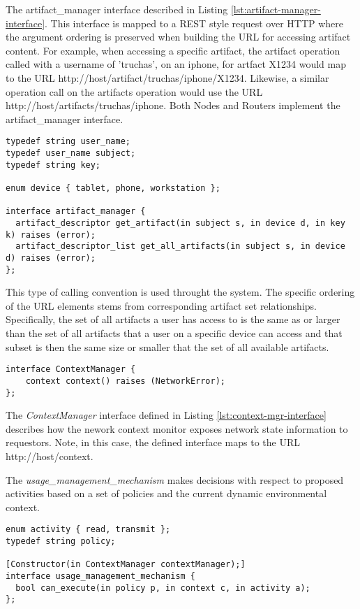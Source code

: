 The artifact\_manager interface described in Listing \ref{lst:artifact-manager-interface}.  This interface is mapped to a REST style request over HTTP where the argument ordering is preserved when building the URL for accessing artifact content.  For example, when accessing a specific artifact, the artifact operation called with a username of 'truchas', on an iphone, for artfact X1234 would map to the URL http://host/artifact/truchas/iphone/X1234.  Likewise, a similar operation call on the artifacts operation would use the URL http://host/artifacts/truchas/iphone.  Both Nodes and Routers implement the artifact\_manager interface.

\begin{lstlisting}[language=idl, label=lst:artifact-manager-interface, caption=The Node Interface]
typedef string user_name;
typedef user_name subject;
typedef string key;

enum device { tablet, phone, workstation };

interface artifact_manager {
  artifact_descriptor get_artifact(in subject s, in device d, in key k) raises (error);
  artifact_descriptor_list get_all_artifacts(in subject s, in device d) raises (error);
};
\end{lstlisting}

This type of calling convention is used throught the system.  The specific ordering of the URL elements stems from corresponding artifact set relationships.  Specifically, the set of all artifacts a user has access to is the same as or larger than the set of all artifacts that a user on a specific device can access and that subset is then the same size or smaller that the set of all available artifacts.

\begin{lstlisting}[language=idl, label=lst:context-mgr-interface, caption=The Context Manager Interface]
interface ContextManager {
	context context() raises (NetworkError);
};
\end{lstlisting}

The \emph{ContextManager} interface defined in Listing \ref{lst:context-mgr-interface} describes how the nework context monitor exposes network state information to requestors.  Note, in this case, the defined interface maps to the URL http://host/context.

The \emph{usage\_management\_mechanism} makes decisions with respect to proposed activities based on a set of policies and the current dynamic environmental context.

\begin{lstlisting}[language=idl, label=lst:umm-interface, caption=The Usage Management Mechanism Interface]
enum activity { read, transmit };
typedef string policy;

[Constructor(in ContextManager contextManager);]
interface usage_management_mechanism {
  bool can_execute(in policy p, in context c, in activity a);
};
\end{lstlisting}

